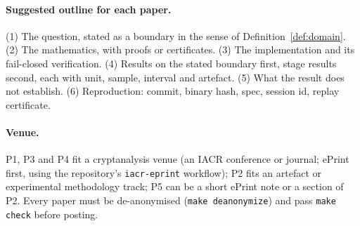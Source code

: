 \paragraph{Suggested outline for each paper.} (1) The question, stated as
a boundary in the sense of Definition~\ref{def:domain}. (2) The
mathematics, with proofs or certificates. (3) The implementation and its
fail-closed verification. (4) Results on the stated boundary first, stage
results second, each with unit, sample, interval and artefact. (5) What the
result does not establish. (6) Reproduction: commit, binary hash, spec,
session id, replay certificate.

\paragraph{Venue.} P1, P3 and P4 fit a cryptanalysis venue (an IACR
conference or journal; ePrint first, using the repository's
\texttt{iacr-eprint} workflow); P2 fits an artefact or experimental
methodology track; P5 can be a short ePrint note or a section of P2.
Every paper must be de-anonymised (\texttt{make deanonymize}) and pass
\texttt{make check} before posting.
